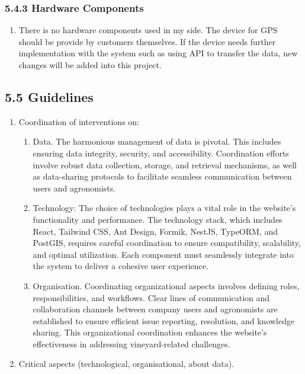 \subsubsection{5.4.3 Hardware Components}
\begin{enumerate}
    \item There is no hardware components used in my side. The device for GPS should be provide by customers themselves. If the device needs further implementation with the system such as using API to transfer the data, new changes will be added into this project.
\end{enumerate}

\subsection{5.5 Guidelines}
\begin{enumerate}
    \item Coordination of interventions on:
          \begin{enumerate}
              \item Data. The harmonious management of data is pivotal. This includes ensuring data integrity, security, and accessibility. Coordination efforts involve robust data collection, storage, and retrieval mechanisms, as well as data-sharing protocols to facilitate seamless communication between users and agronomists.
              \item Technology: The choice of technologies plays a vital role in the website's functionality and performance. The technology stack, which includes React, Tailwind CSS, Ant Design, Formik, NestJS, TypeORM, and PostGIS, requires careful coordination to ensure compatibility, scalability, and optimal utilization. Each component must seamlessly integrate into the system to deliver a cohesive user experience.
              \item Organisation.  Coordinating organizational aspects involves defining roles, responsibilities, and workflows. Clear lines of communication and collaboration channels between company users and agronomists are established to ensure efficient issue reporting, resolution, and knowledge sharing. This organizational coordination enhances the website's effectiveness in addressing vineyard-related challenges.
          \end{enumerate}
    \item Critical aspects (technological, organisational, about data).
\end{enumerate}
